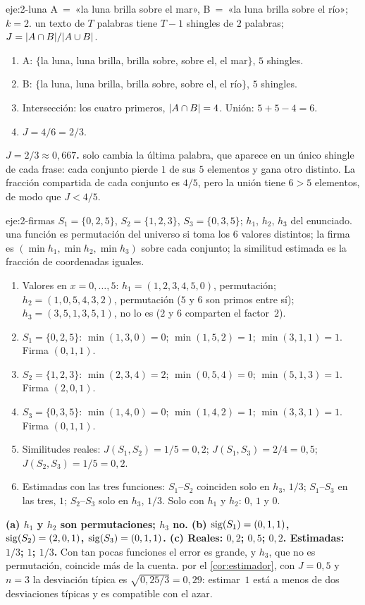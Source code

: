 \begin{solucion}{eje:2-luna}
\datos A~=~«la luna brilla sobre el mar», B~=~«la luna brilla sobre el río»; $k=2$.
\planteamiento un texto de $T$ palabras tiene $T-1$ shingles de $2$ palabras; $J=\lvert A\cap B\rvert/\lvert A\cup B\rvert$.
\pasos
\begin{enumerate}[label=\arabic*.]
  \item A: $\{$la luna, luna brilla, brilla sobre, sobre el, el mar$\}$, $5$ shingles.
  \item B: $\{$la luna, luna brilla, brilla sobre, sobre el, el río$\}$, $5$ shingles.
  \item Intersección: los cuatro primeros, $\lvert A\cap B\rvert=4$. Unión: $5+5-4=6$.
  \item $J=4/6=2/3$.
\end{enumerate}
\resultado \textbf{$J=2/3\approx 0{,}667$.}
\comprobacion solo cambia la última palabra, que aparece en un único shingle de cada frase: cada conjunto pierde $1$ de sus $5$ elementos y gana otro distinto. La fracción compartida de cada conjunto es $4/5$, pero la unión tiene $6>5$ elementos, de modo que $J<4/5$.
\end{solucion}

\begin{solucion}{eje:2-firmas}
\datos $S_1=\{0,2,5\}$, $S_2=\{1,2,3\}$, $S_3=\{0,3,5\}$; $h_1$, $h_2$, $h_3$ del enunciado.
\planteamiento una función es permutación del universo si toma los $6$ valores distintos; la firma es $(\min h_1,\min h_2,\min h_3)$ sobre cada conjunto; la similitud estimada es la fracción de coordenadas iguales.
\pasos
\begin{enumerate}[label=\arabic*.]
  \item Valores en $x=0,\dots,5$: $h_1=(1,2,3,4,5,0)$, permutación; $h_2=(1,0,5,4,3,2)$, permutación ($5$ y $6$ son primos entre sí); $h_3=(3,5,1,3,5,1)$, no lo es ($2$ y $6$ comparten el factor~$2$).
  \item $S_1=\{0,2,5\}$: $\min(1,3,0)=0$; $\min(1,5,2)=1$; $\min(3,1,1)=1$. Firma $(0,1,1)$.
  \item $S_2=\{1,2,3\}$: $\min(2,3,4)=2$; $\min(0,5,4)=0$; $\min(5,1,3)=1$. Firma $(2,0,1)$.
  \item $S_3=\{0,3,5\}$: $\min(1,4,0)=0$; $\min(1,4,2)=1$; $\min(3,3,1)=1$. Firma $(0,1,1)$.
  \item Similitudes reales: $J(S_1,S_2)=1/5=0{,}2$; $J(S_1,S_3)=2/4=0{,}5$; $J(S_2,S_3)=1/5=0{,}2$.
  \item Estimadas con las tres funciones: $S_1$--$S_2$ coinciden solo en $h_3$, $1/3$; $S_1$--$S_3$ en las tres, $1$; $S_2$--$S_3$ solo en $h_3$, $1/3$. Solo con $h_1$ y $h_2$: $0$, $1$ y $0$.
\end{enumerate}
\resultado \textbf{(a) $h_1$ y $h_2$ son permutaciones; $h_3$ no. (b) $\operatorname{sig}(S_1)=(0,1,1)$, $\operatorname{sig}(S_2)=(2,0,1)$, $\operatorname{sig}(S_3)=(0,1,1)$. (c) Reales: $0{,}2$; $0{,}5$; $0{,}2$. Estimadas: $1/3$; $1$; $1/3$.} Con tan pocas funciones el error es grande, y $h_3$, que no es permutación, coincide más de la cuenta.
\comprobacion por el \cref{cor:estimador}, con $J=0{,}5$ y $n=3$ la desviación típica es $\sqrt{0{,}25/3}=0{,}29$: estimar~$1$ está a menos de dos desviaciones típicas y es compatible con el azar.
\end{solucion}

